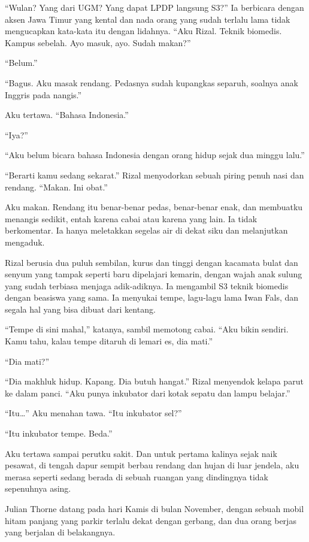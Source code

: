 \documentclass[11pt,twoside,openany]{book}
\makeatletter
\newcommand{\scenebreak}{\par\vspace{0.9em}{\centering\textsc{*\hspace{0.7em}*\hspace{0.7em}*}\par}\vspace{0.9em}\@afterindentfalse\@afterheading}
\makeatother
\begin{document}
``Wulan? Yang dari UGM? Yang dapat LPDP langsung S3?'' Ia berbicara dengan aksen Jawa Timur yang kental dan nada orang yang sudah terlalu lama tidak mengucapkan kata-kata itu dengan lidahnya. ``Aku Rizal. Teknik biomedis. Kampus sebelah. Ayo masuk, ayo. Sudah makan?''

``Belum.''

``Bagus. Aku masak rendang. Pedasnya sudah kupangkas separuh, soalnya anak Inggris pada nangis.''

Aku tertawa. ``Bahasa Indonesia.''

``Iya?''

``Aku belum bicara bahasa Indonesia dengan orang hidup sejak dua minggu lalu.''

``Berarti kamu sedang sekarat.'' Rizal menyodorkan sebuah piring penuh nasi dan rendang. ``Makan. Ini obat.''

Aku makan. Rendang itu benar-benar pedas, benar-benar enak, dan membuatku menangis sedikit, entah karena cabai atau karena yang lain. Ia tidak berkomentar. Ia hanya meletakkan segelas air di dekat siku dan melanjutkan mengaduk.

Rizal berusia dua puluh sembilan, kurus dan tinggi dengan kacamata bulat dan senyum yang tampak seperti baru dipelajari kemarin, dengan wajah anak sulung yang sudah terbiasa menjaga adik-adiknya. Ia mengambil S3 teknik biomedis dengan beasiswa yang sama. Ia menyukai tempe, lagu-lagu lama Iwan Fals, dan segala hal yang bisa dibuat dari kentang.

``Tempe di sini mahal,'' katanya, sambil memotong cabai. ``Aku bikin sendiri. Kamu tahu, kalau tempe ditaruh di lemari es, dia mati.''

``Dia mati?''

``Dia makhluk hidup. Kapang. Dia butuh hangat.'' Rizal menyendok kelapa parut ke dalam panci. ``Aku punya inkubator dari kotak sepatu dan lampu belajar.''

``Itu\ldots{}'' Aku menahan tawa. ``Itu inkubator sel?''

``Itu inkubator tempe. Beda.''

Aku tertawa sampai perutku sakit. Dan untuk pertama kalinya sejak naik pesawat, di tengah dapur sempit berbau rendang dan hujan di luar jendela, aku merasa seperti sedang berada di sebuah ruangan yang dindingnya tidak sepenuhnya asing.

\scenebreak
Julian Thorne datang pada hari Kamis di bulan November, dengan sebuah mobil hitam panjang yang parkir terlalu dekat dengan gerbang, dan dua orang berjas yang berjalan di belakangnya.
\end{document}
